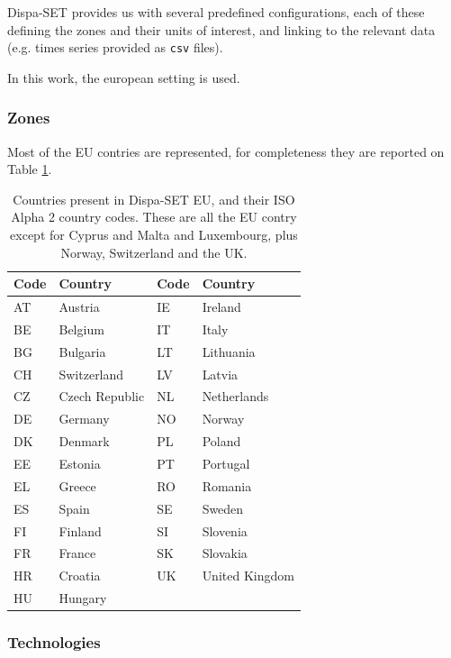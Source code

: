 Dispa-SET provides us with several predefined configurations, each of these defining the zones and their units of interest, and linking to the relevant data (e.g. times series provided as \texttt{csv} files).

In this work, the european setting is used.

\subsubsection{Zones}

Most of the EU contries are represented, for completeness they are reported on Table \ref{table:countries-eu}.

\begin{table}[h]
    \centering
	\begin{tabular}{|l l|l l|}
		\hline
		Code & Country & Code & Country \\
		\hline
		AT & Austria        & IE & Ireland \\
		BE & Belgium        & IT & Italy \\
		BG & Bulgaria       & LT & Lithuania \\
		CH & Switzerland    & LV & Latvia \\
		CZ & Czech Republic & NL & Netherlands \\
		DE & Germany        & NO & Norway \\
		DK & Denmark        & PL & Poland \\
		EE & Estonia        & PT & Portugal \\
		EL & Greece         & RO & Romania \\
		ES & Spain          & SE & Sweden \\
		FI & Finland        & SI & Slovenia \\
		FR & France         & SK & Slovakia \\
		HR & Croatia        & UK & United Kingdom \\
		HU & Hungary        & & \\
		\hline
	\end{tabular}
	\caption{Countries present in Dispa-SET EU, and their ISO Alpha 2 country codes. These are all the EU contry except for Cyprus and Malta and Luxembourg, plus Norway, Switzerland and the UK.}
	\label{table:countries-eu}
\end{table}

\subsubsection{Technologies}

